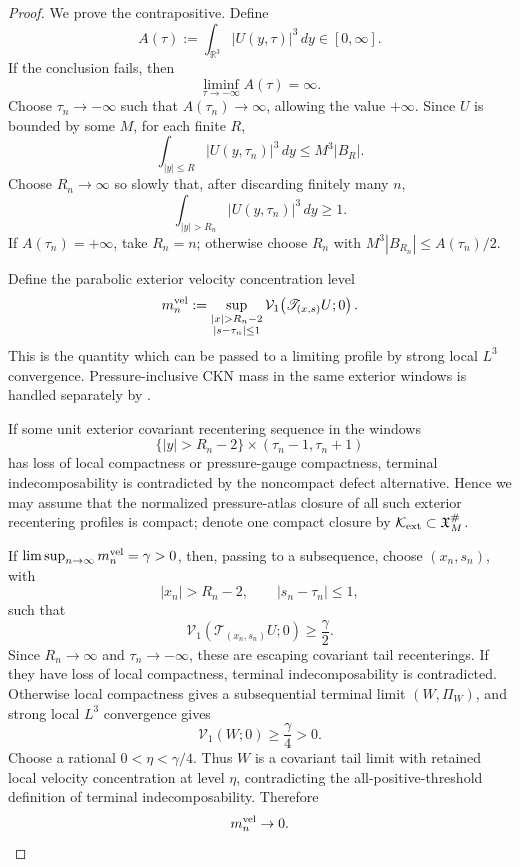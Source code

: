 \documentclass[11pt]{amsart}
\numberwithin{equation}{section}
\theoremstyle{plain}
\theoremstyle{definition}
\theoremstyle{remark}
\newcommand{\R}{\mathbb R}
\newcommand{\Vel}{\mathcal V}
\newcommand{\calK}{\mathcal K}
\begin{document}
\begin{proof}
We prove the contrapositive.  Define
\[
   A(\tau):=\int_{\R^3}|U(y,\tau)|^3\,dy\in[0,\infty].
\]
If the conclusion fails, then
\[
   \liminf_{\tau\to-\infty}A(\tau)=\infty.
\]
Choose \(\tau_n\to-\infty\) such that \(A(\tau_n)\to\infty\), allowing the
value \(+\infty\).  Since \(U\) is bounded by some \(M\), for each finite
\(R\),
\[
   \int_{|y|\le R}|U(y,\tau_n)|^3\,dy\le M^3|B_R|.
\]
Choose \(R_n\to\infty\) so slowly that, after discarding finitely many \(n\),
\[
   \int_{|y|>R_n}|U(y,\tau_n)|^3\,dy\ge1.
\]
If \(A(\tau_n)=+\infty\), take \(R_n=n\); otherwise choose \(R_n\) with
\(M^3|B_{R_n}|\le A(\tau_n)/2\).

Define the parabolic exterior velocity concentration level
\[
   m_n^{\rm vel}
   :=
   \sup_{\substack{|x|>R_n-2\\ |s-\tau_n|\le1}}
   \Vel_1\!\left(
      \mathscr T_{(x,s)}U;0
   \right).
\]
This is the quantity which can be passed to a limiting profile by strong local
\(L^3\) convergence.  Pressure-inclusive CKN mass in the same exterior windows
is handled separately by .

If some unit exterior covariant recentering sequence in the windows
\[
   \{|y|>R_n-2\}\times(\tau_n-1,\tau_n+1)
\]
has loss of local compactness or pressure-gauge compactness, terminal
indecomposability is contradicted by the noncompact defect alternative.  Hence
we may assume that the normalized pressure-atlas closure of all such exterior
recentering profiles is compact; denote one compact closure by
\(\calK_{\rm ext}\subset\mathfrak X_M^\#\).

If \(\limsup_{n\to\infty}m_n^{\rm vel}=\gamma>0\), then, passing to a
subsequence, choose \((x_n,s_n)\), with
\[
   |x_n|>R_n-2,\qquad |s_n-\tau_n|\le1,
\]
such that
\[
   \Vel_1\!\left(\mathscr T_{(x_n,s_n)}U;0\right)
   \ge\frac{\gamma}{2}.
\]
Since \(R_n\to\infty\) and \(\tau_n\to-\infty\), these are escaping covariant
tail recenterings.  If they have loss of local compactness, terminal
indecomposability is contradicted.  Otherwise local compactness gives a
subsequential terminal limit \((W,\Pi_W)\), and strong local \(L^3\) convergence gives
\[
   \Vel_1(W;0)\ge\frac{\gamma}{4}>0 .
\]
Choose a rational \(0<\eta<\gamma/4\).  Thus \(W\) is a covariant tail limit
with retained local velocity concentration at level \(\eta\), contradicting the
all-positive-threshold definition of terminal indecomposability.  Therefore
\[
   m_n^{\rm vel}\to0 .
\]


\end{proof}
\end{document}
